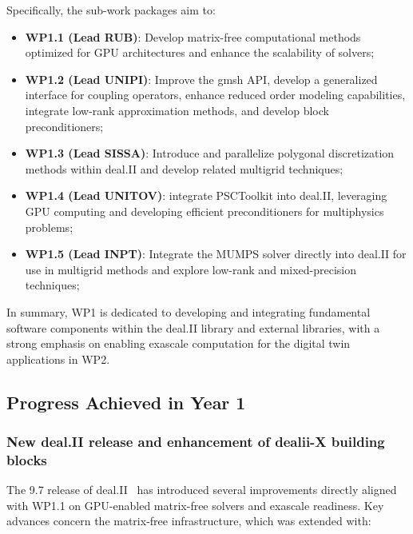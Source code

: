 \documentclass[a4paper,12pt, numbers]{article}
\begin{document}
	Specifically, the sub-work packages aim to:
	\begin{itemize}
		\item \textbf{WP1.1 (Lead RUB)}: Develop matrix-free computational methods optimized for GPU architectures and enhance the scalability of solvers;
		\item \textbf{WP1.2 (Lead UNIPI)}: Improve the gmsh API, develop a generalized interface for coupling operators, enhance reduced order modeling capabilities, integrate low-rank approximation methods, and develop block preconditioners;
		\item \textbf{WP1.3 (Lead SISSA)}: Introduce and parallelize polygonal discretization methods within deal.II and develop related multigrid techniques;
		\item \textbf{WP1.4 (Lead UNITOV)}: integrate PSCToolkit into deal.II, leveraging GPU computing and developing efficient preconditioners for multiphysics problems;
		\item \textbf{WP1.5 (Lead INPT)}: Integrate the MUMPS solver directly into deal.II for use in multigrid methods and explore low-rank and mixed-precision techniques;
	\end{itemize}
	
	In summary, WP1 is dedicated to developing and integrating fundamental software components within the deal.II library and external libraries, with a strong emphasis on enabling exascale computation for the digital twin applications in WP2.
	
	\subsection{Progress Achieved in Year 1} %
	
	\subsubsection*{New deal.II release and enhancement of dealii-X building blocks}
	
	The 9.7 release of deal.II~\cite{deal.II.9.7} has introduced several improvements directly aligned
	with WP1.1 on GPU-enabled matrix-free solvers and exascale readiness.  
	Key advances concern the matrix-free infrastructure, which was extended with:
	
\end{document}

